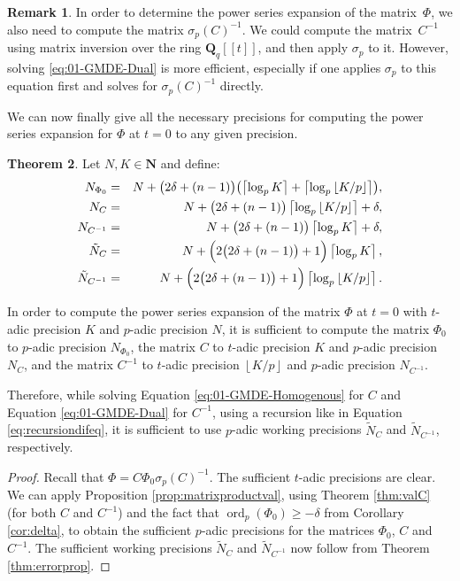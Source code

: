 \documentclass[a4paper,11pt]{article}
\numberwithin{equation}{section}
\providecommand{\floor}[1]{\left\lfloor#1\right\rfloor}   %
\providecommand{\ceil}[1]{\left\lceil#1\right\rceil}   %
\newcommand{\NN}{\mathbf{N}} %
\newcommand{\QQ}{\mathbf{Q}} %
\DeclareMathOperator{\ord}{ord}          %
\theoremstyle{definition}
\newtheorem{thm}{Theorem}[section]
\newtheorem{rem}[thm]{Remark}
\begin{document}
\begin{rem} \label{rem:sigmatrick}
In order to determine the power series expansion of the matrix~$\Phi$, 
we also need to compute the matrix $\sigma_p(C)^{-1}$. We could compute 
the matrix~$C^{-1}$ using matrix inversion over the ring $\mathbf{Q}_q[[t]]$,
and then apply $\sigma_p$ to it. However, solving \eqref{eq:01-GMDE-Dual} is 
more efficient, especially if one applies $\sigma_p$ to this equation first 
and solves for $\sigma_p(C)^{-1}$ directly.
\end{rem}

We can now finally give all the necessary precisions for computing the power series expansion for $\Phi$ at $t=0$ to
any given precision.

\begin{thm} \label{thm:Ni}
Let $N,K \in \NN$ and define:
\begin{eqnarray*}
N_{\Phi_0}   		&=& N+\bigl(2\delta+(n-1)\bigr) \bigl(\ceil{\log_p K} + \ceil{\log_p \floor{K/p}}\bigr),\\
N_{C}				&=& N+\bigl(2\delta+(n-1)\bigr) \ceil{\log_p \floor{K/p}} + \delta, \\
N_{C^{-1}}			&=& N+\bigl(2\delta+(n-1)\bigr) \ceil{\log_p K} + \delta, \\
\tilde{N}_C			&=& N+\Bigl(2 \bigl(2 \delta + (n-1)\bigr) + 1\Bigr) \ceil{\log_p K}, \\
\tilde{N}_{C^{-1}}	&=& N+\Bigl(2 \bigl(2 \delta + (n-1)\bigr) + 1\Bigr) \ceil{\log_p \floor{K/p}}.
\end{eqnarray*}

In order to compute the power series expansion 
of the matrix $\Phi$ at $t=0$ with $t$-adic precision $K$ and $p$-adic precision $N$, 
it is sufficient to compute
the matrix $\Phi_0$ to $p$-adic precision $N_{\Phi_0}$,
the matrix $C$ to $t$-adic precision $K$ and $p$-adic precision $N_{C}$, and
the matrix $C^{-1}$ to $t$-adic precision $\floor{K/p}$ and $p$-adic precision 
$N_{C^{-1}}$.

Therefore, while solving Equation \eqref{eq:01-GMDE-Homogenous} for $C$ and Equation \eqref{eq:01-GMDE-Dual} for $C^{-1}$, 
using a recursion like in Equation \eqref{eq:recursiondifeq}, it is sufficient to use $p$-adic 
working precisions $\tilde{N}_C$ and $\tilde{N}_{C^{-1}}$, respectively.
\end{thm}

\begin{proof}
Recall that $\Phi = C \Phi_0 \sigma_p(C)^{-1}$. The sufficient $t$-adic precisions are clear. 
We can apply Proposition \ref{prop:matrixproductval}, using Theorem \ref{thm:valC} (for both $C$ and $C^{-1}$) 
and the fact that $\ord_p(\Phi_0) \geq -\delta$ from Corollary \ref{cor:delta}, to obtain the sufficient $p$-adic 
precisions for the matrices $\Phi_0$, $C$ and $C^{-1}$. The sufficient working precisions $\tilde{N}_C$ and $\tilde{N}_{C^{-1}}$
now follow from Theorem \ref{thm:errorprop}.
\end{proof}
\end{document}
